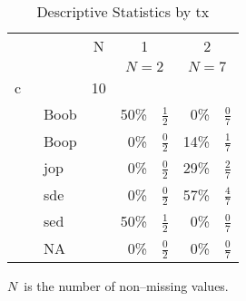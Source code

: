 %
\begin{table}[!tbp]
 \caption{Descriptive Statistics by tx\label{summ}} 
 \begin{center}
 \begin{tabular}{lrcc}\hline\hline
\multicolumn{1}{l}{}&
\multicolumn{1}{c}{N}&
\multicolumn{1}{c}{1}&
\multicolumn{1}{c}{2}
\\   &&\multicolumn{1}{c}{{\scriptsize $N=2$}}&\multicolumn{1}{c}{{\scriptsize $N=7$}}\\ \hline
c&10&&\\
~~~~Boob&&50\%~{\scriptsize~$\frac{1}{2}$}&~0\%~{\scriptsize~$\frac{0}{7}$}\\
~~~~Boop&&~0\%~{\scriptsize~$\frac{0}{2}$}&14\%~{\scriptsize~$\frac{1}{7}$}\\
~~~~jop&&~0\%~{\scriptsize~$\frac{0}{2}$}&29\%~{\scriptsize~$\frac{2}{7}$}\\
~~~~sde&&~0\%~{\scriptsize~$\frac{0}{2}$}&57\%~{\scriptsize~$\frac{4}{7}$}\\
~~~~sed&&50\%~{\scriptsize~$\frac{1}{2}$}&~0\%~{\scriptsize~$\frac{0}{7}$}\\
~~~~NA&&~0\%~{\scriptsize~$\frac{0}{2}$}&~0\%~{\scriptsize~$\frac{0}{7}$}\\
\hline
\end{tabular}

\end{center}

$N$\ is the number of non--missing values.\\

\end{table}

